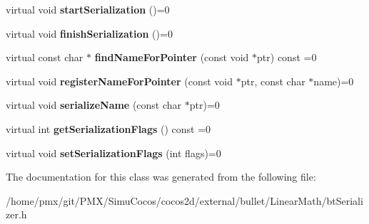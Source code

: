 \begin{DoxyCompactItemize}
\item 
\mbox{\label{classbtSerializer_a7ab4fa452564cb52eec170cc6ee9f133}} 
virtual void {\bfseries start\+Serialization} ()=0
\item 
\mbox{\label{classbtSerializer_a73de9ac3f916608e26ea0f5f16939abc}} 
virtual void {\bfseries finish\+Serialization} ()=0
\item 
\mbox{\label{classbtSerializer_a1486d0a4683e152dd3f17a083d8e88f7}} 
virtual const char $\ast$ {\bfseries find\+Name\+For\+Pointer} (const void $\ast$ptr) const =0
\item 
\mbox{\label{classbtSerializer_af4e2e226d06cd9264df03431fc376f25}} 
virtual void {\bfseries register\+Name\+For\+Pointer} (const void $\ast$ptr, const char $\ast$name)=0
\item 
\mbox{\label{classbtSerializer_a6f412ae1276a14cc818f4fd6b3cf167c}} 
virtual void {\bfseries serialize\+Name} (const char $\ast$ptr)=0
\item 
\mbox{\label{classbtSerializer_a634cc0d456c8d5bb2e2d242faf192787}} 
virtual int {\bfseries get\+Serialization\+Flags} () const =0
\item 
\mbox{\label{classbtSerializer_a1f46d70e6fd62daaccedc06073617203}} 
virtual void {\bfseries set\+Serialization\+Flags} (int flags)=0
\end{DoxyCompactItemize}


The documentation for this class was generated from the following file\+:\begin{DoxyCompactItemize}
\item 
/home/pmx/git/\+P\+M\+X/\+Simu\+Cocos/cocos2d/external/bullet/\+Linear\+Math/bt\+Serializer.\+h\end{DoxyCompactItemize}
